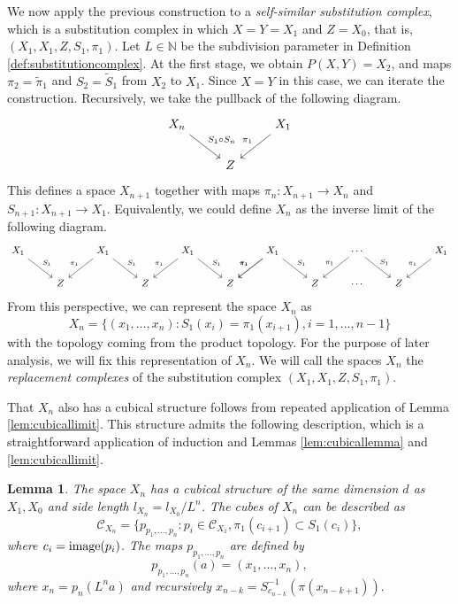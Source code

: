 \documentclass{amsart}
\theoremstyle{plain}
\newtheorem{lemma}[theorem]{Lemma}
\theoremstyle{definition}
\numberwithin{equation}{section}
\numberwithin{theorem}{section}
\newcommand{\N}{\mathbb{N}}
\newcommand{\cC}{\mathcal{C}}
\begin{document}
We now apply the previous construction to a \emph{self-similar substitution complex}, which is a substitution complex in which $X=Y=X_1$ and $Z=X_0$, that is, $(X_1,X_1,Z,S_1,\pi_1)$. Let $L\in\N$ be the subdivision parameter in Definition \ref{def:substitutioncomplex}. At the first stage, we obtain $P(X,Y)=X_2$, and maps $\pi_{2}=\tilde{\pi}_1$ and $S_2=\tilde{S}_1$ from $X_2$ to $X_1$. Since $X=Y$ in this case, we can iterate the construction. Recursively, we take the pullback of the following diagram.
\[\begin{tikzcd}
	X_{n} && X_1 \\
	& Z
	\arrow["S_1 \circ S_n", from=1-1, to=2-2]
	\arrow["\pi_1"', from=1-3, to=2-2]
\end{tikzcd}\]
This defines a space $X_{n+1}$ together with maps $\pi_{n}:X_{n+1}\to X_n$ and $S_{n+1
}:X_{n+1}\to X_1$. Equivalently, we could define $X_n$ as the inverse limit of the following diagram.
\begin{equation}\label{tik:xndiagram}
\begin{tikzcd}
	X_{1} && X_1 && X_1 && X_1 &&\cdots && X_1  \\
	& Z && Z && Z && Z &\cdots& Z  
	\arrow["S_1", from=1-1, to=2-2] \arrow["S_1", from=1-3, to=2-4] \arrow["S_1", from=1-5, to=2-6] \arrow["S_1", from=1-7, to=2-8] \arrow["S_1", from=1-9, to=2-10]
	\arrow["\pi_1"', from=1-3, to=2-2] \arrow["\pi_1"', from=1-5, to=2-4] \arrow["\pi_1"', from=1-7, to=2-6] \arrow["\pi_1"', from=1-7, to=2-6] \arrow["\pi_1"', from=1-9, to=2-8] \arrow["\pi_1"', from=1-11, to=2-10]
\end{tikzcd}
\end{equation}
From this perspective, we can represent the space $X_n$ as
\begin{equation}\label{eq:Xnrep}
X_n=\{(x_1,\dots, x_n) : S_1(x_i)=\pi_1(x_{i+1}), i=1, \dots, n-1\}
\end{equation}
with the topology coming from the product topology. For the purpose of later analysis, we will fix this representation of  $X_n$. We will call the spaces $X_n$ the \textit{replacement complexes} of the substitution complex $(X_1, X_1, Z, S_1, \pi_1)$.

That $X_n$ also has a cubical structure follows from repeated application of Lemma \ref{lem:cubicallimit}. This structure admits the following description, which is a straightforward application of induction and Lemmas \ref{lem:cubicallemma} and \ref{lem:cubicallimit}.

\begin{lemma}\label{lem:cubicalxn}
The space $X_n$ has a cubical structure of the same dimension $d$ as $X_1, X_0$ and side length $l_{X_n}=l_{X_0}/L^n$. The cubes of $X_n$ can be described as 
$$ \cC_{X_n} = \{p_{p_1, \dots, p_n} : p_i \in \cC_{X_1}, \pi_1(c_{i+1})\subset S_1(c_i) \},$$
where $c_i = {\rm image}(p_i)$. The maps $p_{p_1, \dots, p_n}$ are defined by
$$ p_{p_1,\dots, p_n}(a) = (x_1, \dots, x_n),$$
where $x_n = p_n(L^n a)$ and recursively $x_{n-k} = S_{c_{n-k}}^{-1}(\pi(x_{n-k+1})).$
\end{lemma}
\end{document}
